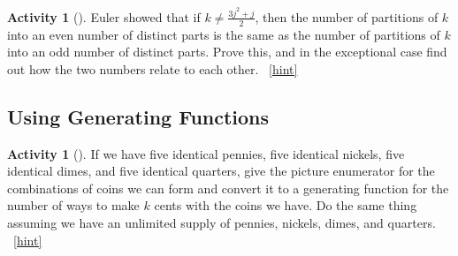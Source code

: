\documentclass[10pt,]{book}
\theoremstyle{plain}
\theoremstyle{definition}
\theoremstyle{definition}
\theoremstyle{definition}
\newtheorem{activity}[project]{Activity}
\numberwithin{equation}{chapter}
\begin{document}
\begin{activity}[]\label{activity-253}
\hypertarget{p-1146}{}%
Euler showed that if \(k\not= \frac{3j^2+j}{2}\), then the number of partitions of \(k\) into an even number of distinct parts is the same as the number of partitions of \(k\) into an odd number of distinct parts. Prove this, and in the exceptional case find out how the two numbers relate to each other.%
~\hfill{\tiny\hyperlink{a-253}{[hint]}\hypertarget{q-253}{}}\end{activity}
\typeout{************************************************}
\typeout{************************************************}
\subsection[{Using Generating Functions}]{Using Generating Functions}\label{sec_genfns-int-parts}
\begin{activity}[]\label{change-making}
\hypertarget{p-1153}{}%
If we have five identical pennies, five identical nickels, five identical dimes, and five identical quarters, give the picture enumerator for the combinations of coins we can form and convert it to a generating function for the number of ways to make \(k\) cents with the coins we have. Do the same thing assuming we have an unlimited supply of pennies, nickels, dimes, and quarters.%
~\hfill{\tiny\hyperlink{a-254}{[hint]}\hypertarget{q-254}{}}\end{activity}
\end{document}
